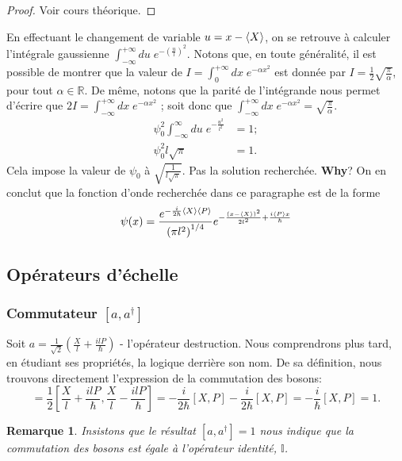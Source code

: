 \documentclass[11pt,oneside,a4paper]{article}
\newcommand{\h}{\ensuremath{\hbar}}
\newtheorem{remark}[theorem]{Remarque}
\begin{document}
\begin{proof}
  Voir cours théorique.
\end{proof}

En effectuant le changement de variable $u = x-\expval{X}$, on se retrouve à calculer l'intégrale gaussienne $\int_{-\infty}^{+\infty} du \; e^{-\left(\frac{u}{l}  \right)^2}$. Notons que, en toute généralité, il est possible de montrer que la valeur de $I = \int_0^{+\infty} dx \; e^{-\alpha x^2}$ est donnée par $I = \frac{1}{2}\sqrt{\frac{\pi}{\alpha}}$, pour tout $\alpha\in\mathbb{R}$. De même, notons que la parité de l'intégrande nous permet d'écrire que $2I = \int_{-\infty}^{+\infty} dx \; e^{-\alpha x^2}$ ; soit donc que $\int_{-\infty}^{+\infty} dx \; e^{-\alpha x^2} = \sqrt{\frac{\pi}{\alpha}}$.
\begin{align}
  \psi_0^2 \int_{-\infty}^{\infty} du \; e^{-\frac{u^2}{l^2}} &= 1;\\
  \psi_0^2 l\sqrt{\pi} &= 1.
\end{align}
Cela impose la valeur de $\psi_0$ à $\sqrt{\frac{1}{l\sqrt{\pi}}}$. \color{red} Pas la solution recherchée. \textbf{Why}? \color{black} On en conclut que la fonction d'onde recherchée dans ce paragraphe est de la forme 
\begin{equation}
  \psi(x) = \frac{e^{-\frac{i}{2\h}\expval{X}\expval{P}}}{\left(\pi l^2\right)^{1/4}}e^{-\frac{\left(x-\expval{X}\right)^2}{2l^2}+\frac{i\expval{P}x}{\hbar}}
\end{equation}

\subsection{Opérateurs d'échelle}
\subsubsection{Commutateur $[a,a^\dagger]$}
Soit $a = \frac{1}{\sqrt{2}} \left(\frac{X}{l}+\frac{ilP}{\hbar}\right)$ - l'opérateur destruction. Nous comprendrons plus tard, en étudiant ses propriétés, la logique derrière son nom. De sa définition, nous trouvons directement l'expression de la commutation des bosons:
\begin{equation}
    [a,a^\dagger] = \frac{1}{2} [\frac{X}{l}+\frac{ilP}{\hbar},\frac{X}{l}-\frac{ilP}{\hbar}] = -\frac{i}{2\h} [X,P]-\frac{i}{2\h}[X,P] = -\frac{i}{\h}[X,P] = 1. 
\end{equation}

\begin{remark}
  Insistons que le résultat $[a,a^\dagger] = 1$ nous indique que la commutation des bosons est égale à l'opérateur identité, $\mathbb{I}$.
\end{remark}
\end{document}
